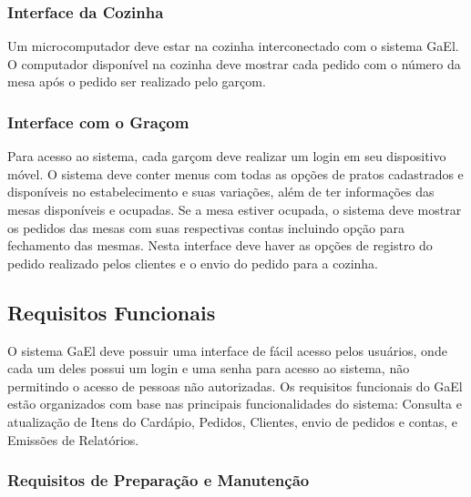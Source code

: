 \documentclass[11pt,a4paper]{article}
\begin{document}
\subsubsection{Interface da Cozinha}

Um microcomputador deve estar na cozinha interconectado com o sistema GaEl. O computador disponível na cozinha deve mostrar cada pedido com o número da mesa após o pedido ser realizado pelo garçom.

\subsubsection{Interface com o Graçom}

Para acesso ao sistema, cada garçom deve realizar um login em seu dispositivo móvel. O sistema deve conter menus com todas as opções de pratos cadastrados e disponíveis no estabelecimento e suas variações, além de ter informações das mesas disponíveis e ocupadas. Se a mesa estiver ocupada, o sistema deve mostrar os pedidos das mesas com suas respectivas contas incluindo opção para fechamento das mesmas. Nesta interface deve haver as opções de registro do pedido realizado pelos clientes e o envio do pedido para a cozinha.

\subsection{Requisitos Funcionais}

O sistema GaEl deve possuir uma interface de fácil acesso pelos usuários, onde cada um deles possui um login e uma senha para acesso ao sistema, não permitindo o acesso de pessoas não autorizadas. Os requisitos funcionais do GaEl estão organizados com base nas principais funcionalidades do sistema: Consulta e atualização de Itens do Cardápio, Pedidos, Clientes, envio de pedidos e contas, e Emissões de Relatórios.

\subsubsection{Requisitos de Preparação e Manutenção}
\end{document}
